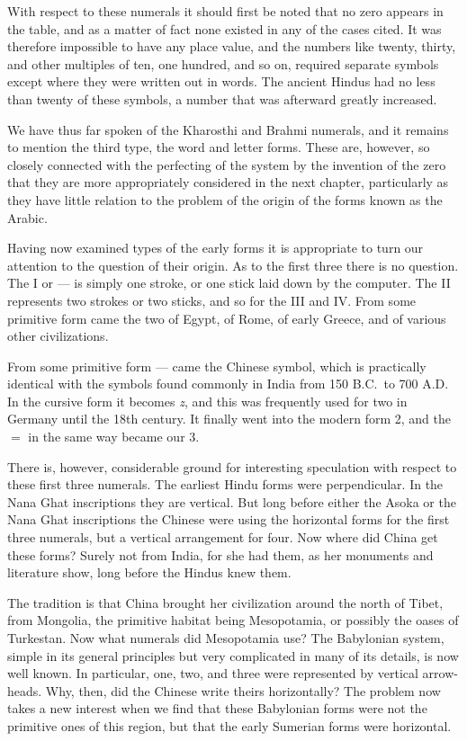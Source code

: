 \documentclass[11pt,a4paper]{article}
\begin{document}
With respect to these numerals it should first be noted that no zero appears in the table, and as a matter of fact none existed in any of the cases cited. It was therefore impossible to have any place value, and the numbers like twenty, thirty, and other multiples of ten, one hundred, and so on, required separate symbols except where they were written out in words. The ancient Hindus had no less than twenty of these symbols, a number that was afterward greatly increased.

We have thus far spoken of the Kharosthi and Brahmi numerals, and it remains to mention the third type, the word and letter forms. These are, however, so closely connected with the perfecting of the system by the invention of the zero that they are more appropriately considered in the next chapter, particularly as they have little relation to the problem of the origin of the forms known as the Arabic.

Having now examined types of the early forms it is appropriate to turn our attention to the question of their origin. As to the first three there is no question. The I or --- is simply one stroke, or one stick laid down by the computer. The II represents two strokes or two sticks, and so for the III and IV. From some primitive form came the two of Egypt, of Rome, of early Greece, and of various other civilizations.

From some primitive form --- came the Chinese symbol, which is practically identical with the symbols found commonly in India from 150 B.C.\ to 700 A.D. In the cursive form it becomes \textit{z}, and this was frequently used for two in Germany until the 18th century. It finally went into the modern form 2, and the $=$ in the same way became our 3.

There is, however, considerable ground for interesting speculation with respect to these first three numerals. The earliest Hindu forms were perpendicular. In the Nana Ghat inscriptions they are vertical. But long before either the Asoka or the Nana Ghat inscriptions the Chinese were using the horizontal forms for the first three numerals, but a vertical arrangement for four. Now where did China get these forms? Surely not from India, for she had them, as her monuments and literature show, long before the Hindus knew them.

The tradition is that China brought her civilization around the north of Tibet, from Mongolia, the primitive habitat being Mesopotamia, or possibly the oases of Turkestan. Now what numerals did Mesopotamia use? The Babylonian system, simple in its general principles but very complicated in many of its details, is now well known. In particular, one, two, and three were represented by vertical arrow-heads. Why, then, did the Chinese write theirs horizontally? The problem now takes a new interest when we find that these Babylonian forms were not the primitive ones of this region, but that the early Sumerian forms were horizontal.
\end{document}
